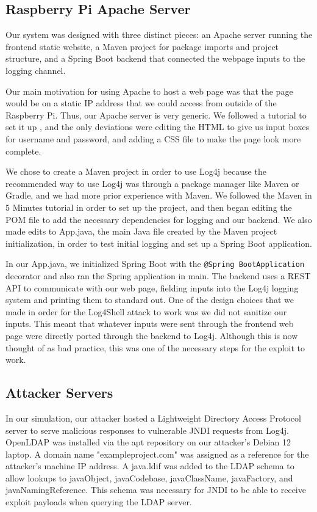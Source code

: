 \documentclass[sigconf]{acmart}
\begin{document}
\subsection{Raspberry Pi Apache Server}

Our system was designed with three distinct pieces: an Apache server running the frontend static website, 
a Maven project for package imports and project structure, and a Spring Boot backend that 
connected the webpage inputs to the logging channel.

Our main motivation for using Apache to host a web page was that the page would be on a static IP address that 
we could access from outside of the Raspberry Pi. Thus, our Apache server is very generic. We followed a tutorial to set it up \cite{Islam}, 
and the only deviations were editing the HTML to give us input boxes for username and password, and adding a CSS 
file to make the page look more complete. 

We chose to create a Maven project in order to use Log4j because the recommended way to use Log4j was through a package manager 
like Maven or Gradle, and we had more prior experience with Maven. We followed the Maven in 5 Minutes tutorial \cite{Maven} in order to 
set up the project, and then began editing the POM file to add the necessary dependencies for logging and our backend. 
We also made edits to App.java, the main Java file created by the Maven project initialization, in order to test initial 
logging and set up a Spring Boot application.

In our App.java, we initialized Spring Boot with the \texttt{@Spring
BootApplication} decorator and also ran the Spring application in main. 
The backend uses a REST API to communicate with our web page, fielding inputs into the Log4j logging system and printing them to standard out. 
One of the design choices that we made in order for the Log4Shell attack to work was we did not sanitize our inputs. This meant that whatever
inputs were sent through the frontend web page were directly ported through the backend to Log4j. Although this is now thought of as bad practice,
this was one of the necessary steps for the exploit to work.

\subsection{Attacker Servers}

In our simulation, our attacker hosted a Lightweight Directory Access Protocol server to serve malicious responses to
vulnerable JNDI requests from Log4j. OpenLDAP was installed via the apt repository on our attacker's Debian 12 laptop.
A domain name "exampleproject.com" was assigned as a reference for the attacker's machine IP address.    
A java.ldif was added to the LDAP schema to allow lookups to javaObject, javaCodebase, javaClassName, javaFactory, and javaNamingReference.
This schema was necessary for JNDI to be able to receive exploit payloads when querying the LDAP server.
\end{document}
